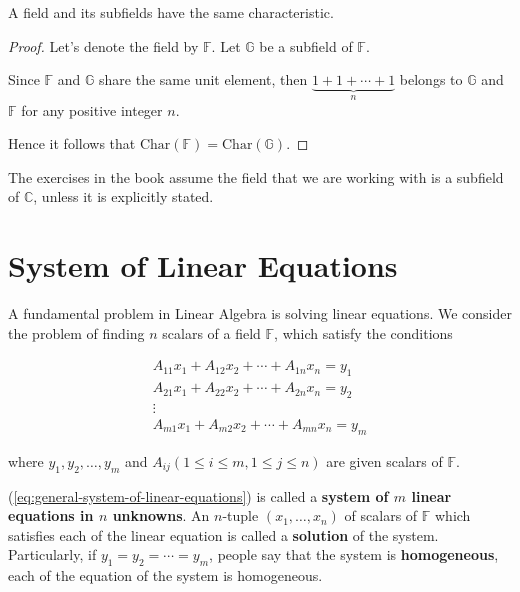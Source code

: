 \begin{theorem}
	A field and its subfields have the same characteristic.
\end{theorem}

\begin{proof}
	Let's denote the field by $\mathbb{F}$. Let $\mathbb{G}$ be a subfield of $\mathbb{F}$.

	Since $\mathbb{F}$ and $\mathbb{G}$ share the same unit element, then $\underbrace{1 + 1 + \cdots + 1}_{n}$ belongs to $\mathbb{G}$ and $\mathbb{F}$ for any positive integer $n$.

	Hence it follows that $\text{Char}(\mathbb{F}) = \text{Char}(\mathbb{G})$.
\end{proof}

The exercises in the book assume the field that we are working with is a subfield of $\mathbb{C}$, unless it is explicitly stated.

\section{System of Linear Equations}

A fundamental problem in Linear Algebra is solving linear equations. We consider the problem of finding $n$ scalars of a field $\mathbb{F}$, which satisfy the conditions

\begin{equation}
	\begin{split}
		A_{11}x_{1} + A_{12}x_{2} + \cdots + A_{1n}x_{n} = y_{1}  \\
		A_{21}x_{1} + A_{22}x_{2} + \cdots + A_{2n}x_{n} = y_{2}  \\
		\vdots \\
		A_{m1}x_{1} + A_{m2}x_{2} + \cdots + A_{mn}x_{n} = y_{m}
	\end{split}\label{eq:general-system-of-linear-equations}
\end{equation}

where $y_{1}, y_{2}, \ldots, y_{m}$ and $A_{ij} (1\le i\le m, 1\le j\le n)$ are given scalars of $\mathbb{F}$.

(\ref{eq:general-system-of-linear-equations}) is called a \textbf{system of $m$ linear equations in $n$ unknowns}. An $n$-tuple $(x_{1}, \ldots, x_{n})$ of scalars of $\mathbb{F}$ which satisfies each of the linear equation is called a \textbf{solution} of the system. Particularly, if $y_{1} = y_{2} = \cdots = y_{m}$, people say that the system is \textbf{homogeneous}, each of the equation of the system is homogeneous.

